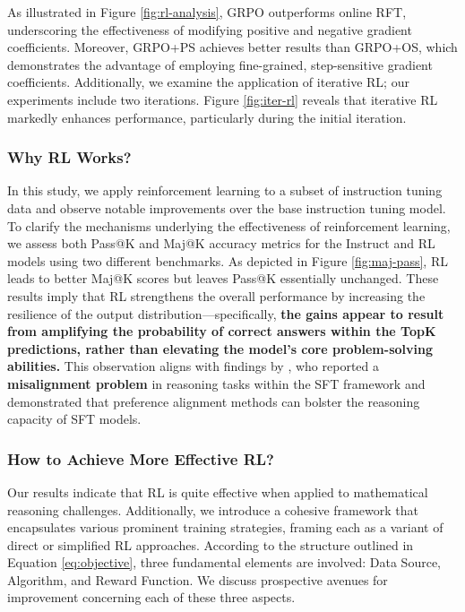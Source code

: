 \begin{itemize}[topsep=0pt]
As illustrated in Figure \ref{fig:rl-analysis}, GRPO outperforms online RFT, underscoring the effectiveness of modifying positive and negative gradient coefficients. Moreover, GRPO+PS achieves better results than GRPO+OS, which demonstrates the advantage of employing fine-grained, step-sensitive gradient coefficients. Additionally, we examine the application of iterative RL; our experiments include two iterations. Figure \ref{fig:iter-rl} reveals that iterative RL markedly enhances performance, particularly during the initial iteration.

\subsubsection{Why RL Works?} In this study, we apply reinforcement learning to a subset of instruction tuning data and observe notable improvements over the base instruction tuning model. To clarify the mechanisms underlying the effectiveness of reinforcement learning, we assess both Pass@K and Maj@K accuracy metrics for the Instruct and RL models using two different benchmarks. As depicted in Figure \ref{fig:maj-pass}, RL leads to better Maj@K scores but leaves Pass@K essentially unchanged. These results imply that RL strengthens the overall performance by increasing the resilience of the output distribution—specifically, \textbf{the gains appear to result from amplifying the probability of correct answers within the TopK predictions, rather than elevating the model’s core problem-solving abilities.} This observation aligns with findings by \citep{wang2023making}, who reported a \textbf{misalignment problem} in reasoning tasks within the SFT framework and demonstrated that preference alignment methods \citep{yuan2023rrhf,song2023preference,wang2023making} can bolster the reasoning capacity of SFT models.

\subsubsection{How to Achieve More Effective RL?}
\label{sec:effec_rl}
Our results indicate that RL is quite effective when applied to mathematical reasoning challenges. Additionally, we introduce a cohesive framework that encapsulates various prominent training strategies, framing each as a variant of direct or simplified RL approaches. According to the structure outlined in Equation \ref{eq:objective}, three fundamental elements are involved: Data Source, Algorithm, and Reward Function. We discuss prospective avenues for improvement concerning each of these three aspects.


\end{itemize}
